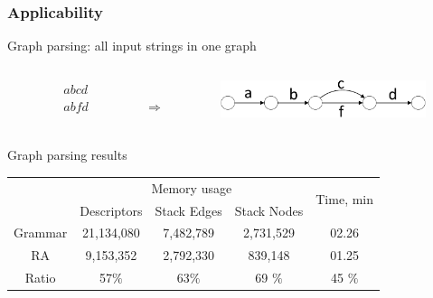 \documentclass{beamer}
\begin{document}
	\begin{frame} 
		\frametitle{Applicability} 
		\begin{center}
		\vspace{-40pt}
		Graph parsing: all input strings in one graph
		\begin{columns}
			\begin{column}{1cm}
			\end{column}
			\begin{column}{1cm}
				\begin{center}
				$abcd$ \\ 
				$abfd$
				\end{center}
			\end{column}
			\begin{column}{.7cm}
				\\
				$ \Longrightarrow $
			\end{column}
			\begin{column}{6cm}
			\includegraphics[width=6cm]{pictures/graph.pdf}
			\end{column}
		\end{columns}
		\vspace{40pt}
		Graph parsing results
		\begin{tabular}{ | c | c | c | c | c | }
			\hline
			\multirow{2}{*}[-1ex]{} &\multicolumn{3}{c|}{Memory usage} & \multirow{2}{*}[-1ex]{Time, min } \\
			\cline{2-4}
			             &  Descriptors & Stack Edges & Stack Nodes &   \\ \hline
			Grammar  &  21,134,080       & 7,482,789      & 2,731,529      & 02.26  \\ \hline
			RA &  9,153,352        &  2,792,330     & 839,148        & 01.25  \\ \hline \hline
			Ratio   &  57$\%$       & 63$\%$     & 69 $\%$    &  45 $\%$ \\ \hline
		\end{tabular}
		\end{center}
	\end{frame} 
	
\end{document}
